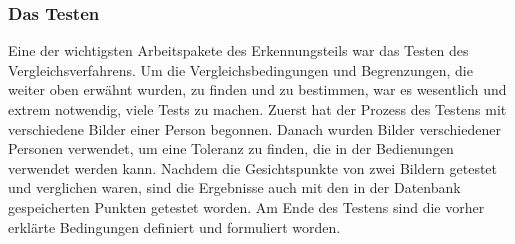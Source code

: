 \subsubsection{Das Testen}
Eine der wichtigsten Arbeitspakete des Erkennungsteils war das Testen des Vergleichsverfahrens. Um die Vergleichsbedingungen und Begrenzungen, die weiter oben erwähnt wurden, zu finden und zu bestimmen, war es wesentlich und extrem notwendig, viele Tests zu machen. Zuerst hat der Prozess des Testens mit verschiedene Bilder einer Person begonnen. Danach wurden Bilder verschiedener Personen verwendet, um eine Toleranz zu finden, die in der Bedienungen verwendet werden kann. Nachdem die Gesichtspunkte von zwei Bildern getestet und verglichen waren, sind die Ergebnisse auch mit den in der Datenbank gespeicherten Punkten getestet worden. Am Ende des Testens sind die vorher erklärte Bedingungen definiert und formuliert worden.\\

